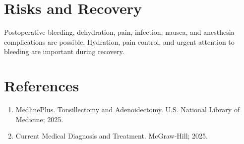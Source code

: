 \section*{Risks and Recovery}
Postoperative bleeding, dehydration, pain, infection, nausea, and anesthesia complications are possible. Hydration, pain control, and urgent attention to bleeding are important during recovery.
\section*{References}
\begin{enumerate}\item MedlinePlus. Tonsillectomy and Adenoidectomy. U.S. National Library of Medicine; 2025.\item Current Medical Diagnosis and Treatment. McGraw-Hill; 2025.\end{enumerate}
\clearpage
